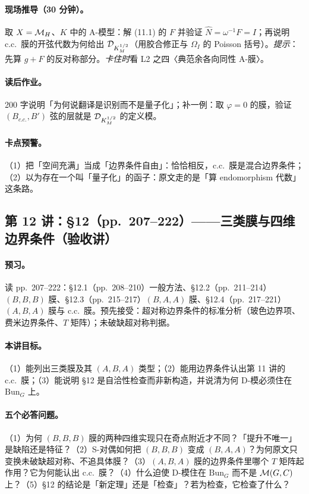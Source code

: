 {\paragraph{现场推导（30 分钟）。}取 \(X=\mathcal{M}_H\)、\(K\) 中的 A-模型：解 (11.1) 的 \(F\) 并验证 \(\hat N=\omega^{-1}F=I\)；再说明 c.c.\ 膜的开弦代数为何给出 \(\mathcal{D}_{K_M^{1/2}}\)（用胶合修正与 \(\Omega_I\) 的 Poisson 括号）。\emph{提示}：先算 \(g+F\) 的反对称部分。\emph{卡住时}看 L2 之四〈典范余各向同性 A-膜〉。\pC

\paragraph{读后作业。}200 字说明「为何说翻译是识别而不是量子化」；补一例：取 \(\varphi=0\) 的膜，验证 \((B_{c.c.},B')\) 弦的层就是 \(\mathcal{D}_{K_M^{1/2}}\) 的定义模。\pC

\paragraph{卡点预警。}（1）把「空间充满」当成「边界条件自由」：恰恰相反，c.c.\ 膜是混合边界条件；（2）以为存在一个叫「量子化」的函子：原文走的是「算 endomorphism 代数」这条路。\pC

\subsection{第 12 讲：\S12（pp.~207--222）——三类膜与四维边界条件（验收讲）}

\paragraph{预习。}读 pp.~207--222：§12.1（pp.~208--210）一般方法、§12.2（pp.~211--214）\((B,B,B)\) 膜、§12.3（pp.~215--217）\((B,A,A)\) 膜、§12.4（pp.~217--221）\((A,B,A)\) 膜与 c.c.\ 膜。预先接受：超对称边界条件的标准分析（玻色边界项、费米边界条件、\(T\) 矩阵）；未破缺超对称判据。\pC

\paragraph{本讲目标。}（1）能列出三类膜及其 \((A,B,A)\) 类型；（2）能用边界条件认出第 11 讲的 c.c.\ 膜；（3）能说明 §12 是自洽性检查而非新构造，并说清为何 D-模必须住在 \(\mathrm{Bun}_G\) 上。\pC

\paragraph{五个必答问题。}（1）为何 \((B,B,B)\) 膜的两种四维实现只在奇点附近才不同？「提升不唯一」是缺陷还是特征？（2）S-对偶如何把 \((B,B,B)\) 变成 \((B,A,A)\)？为何原文只变换未破缺超对称、不追具体膜？（3）\((A,B,A)\) 膜的边界条件里哪个 \(T\) 矩阵起作用？它为何能认出 c.c.\ 膜？（4）什么迫使 D-模住在 \(\mathrm{Bun}_G\) 而不是 \(\mathcal{M}(G,C)\) 上？（5）§12 的结论是「新定理」还是「检查」？若为检查，它检查了什么？\pC

}
